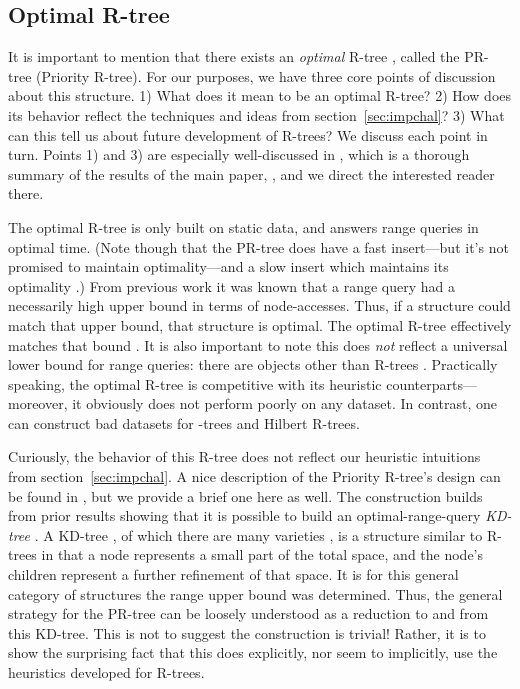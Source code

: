 \subsection{Optimal R-tree}
It is important to mention that there exists an \emph{optimal} R-tree \cite{argeberghaverkortyi04}, called the PR-tree (Priority R-tree).
For our purposes, we have three core points of discussion about this structure.
1) What does it mean to be an optimal R-tree?
2) How does its behavior reflect the techniques and ideas from section~\ref{sec:impchal}?
3) What can this tell us about future development of R-trees?
We discuss each point in turn.
Points 1) and 3) are especially well-discussed in \cite{yi12}, which is a thorough summary of the results of the main paper, \cite{argeberghaverkortyi04}, and we direct the interested reader there.

The optimal R-tree is only built on static data, and answers range queries in optimal time.
(Note though that the PR-tree does have a fast insert---but it's not promised to maintain optimality---and a slow insert which maintains its optimality \cite{argeberghaverkortyi04}.)
From previous work \cite{kanthsingh99} it was known that a range query had a necessarily high upper bound in terms of node-accesses.
Thus, if a structure could match that upper bound, that structure is optimal.
The optimal R-tree effectively matches that bound \cite{yi12}.
It is also important to note this does \emph{not} reflect a universal lower bound for range queries: there are objects other than R-trees \cite{argesamoladasvitter99}.
Practically speaking, the optimal R-tree is competitive with its heuristic counterparts---moreover, it obviously does not perform poorly on any dataset.
In contrast, one can construct bad datasets for \rstar-trees and Hilbert R-trees.

Curiously, the behavior of this R-tree does not reflect our heuristic intuitions from section~\ref{sec:impchal}.
A nice description of the Priority R-tree's design can be found in \cite{thebook}, but we provide a brief one here as well.
The construction builds from prior results showing that it is possible to build an optimal-range-query \emph{KD-tree} \cite{agarwalberggudmundssonhammarhaverkort01}.
A KD-tree \cite{bentley75}, of which there are many varieties \cite{gaedegunther98}, is a structure similar to R-trees in that a node represents a small part of the total space, and the node's children represent a further refinement of that space.
It is for this general category of structures the range upper bound was determined.
Thus, the general strategy for the PR-tree can be loosely understood as a reduction to and from this KD-tree.
This is not to suggest the construction is trivial! Rather, it is to show the surprising fact that this does explicitly, nor seem to implicitly, use the heuristics developed for R-trees.

